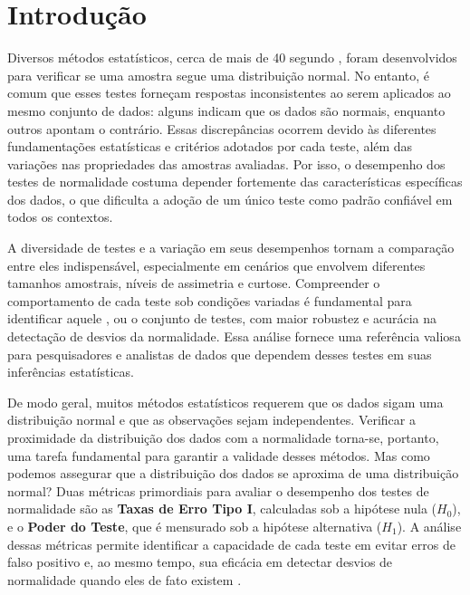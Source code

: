 \documentclass[a4paper,11pt]{article} %
\begin{document}
\section{Introdução} %

Diversos métodos estatísticos, cerca de mais de 40 segundo \cite{dufour1998simulation}, foram desenvolvidos para verificar se uma amostra segue uma distribuição normal. No entanto, é comum que esses testes forneçam respostas inconsistentes ao serem aplicados ao mesmo conjunto de dados: alguns indicam que os dados são normais, enquanto outros apontam o contrário. Essas discrepâncias ocorrem devido às diferentes fundamentações estatísticas e critérios adotados por cada teste, além das variações nas propriedades das amostras avaliadas. Por isso, o desempenho dos testes de normalidade costuma depender fortemente das características específicas dos dados, o que dificulta a adoção de um único teste como padrão confiável em todos os contextos. 

\vspace{0.5cm}

A diversidade de testes e a variação em seus desempenhos tornam a comparação entre eles indispensável, especialmente em cenários que envolvem diferentes tamanhos amostrais, níveis de assimetria e curtose. Compreender o comportamento de cada teste sob condições variadas é fundamental para identificar aquele , ou o conjunto de testes, com maior robustez e acurácia na detectação de desvios da normalidade. Essa análise fornece uma referência valiosa para pesquisadores e analistas de dados que dependem desses testes em suas inferências estatísticas.

\vspace{0.5cm}

De modo geral, muitos métodos estatísticos requerem que os dados sigam uma distribuição normal e que as observações sejam independentes. Verificar a proximidade da distribuição dos dados com a normalidade torna-se, portanto, uma tarefa fundamental para garantir a validade desses métodos. Mas como podemos assegurar que a distribuição dos dados se aproxima de uma distribuição normal? Duas métricas primordiais para avaliar o desempenho dos testes de normalidade são as \textbf{Taxas de Erro Tipo I}, calculadas sob a hipótese nula ($H_0$), e o \textbf{Poder do Teste}, que é mensurado sob a hipótese alternativa ($H_1$). A análise dessas métricas permite identificar a capacidade de cada teste em evitar erros de falso positivo e, ao mesmo tempo, sua eficácia em detectar desvios de normalidade quando eles de fato existem \cite{cardoso2010multivariate}.
\end{document}
